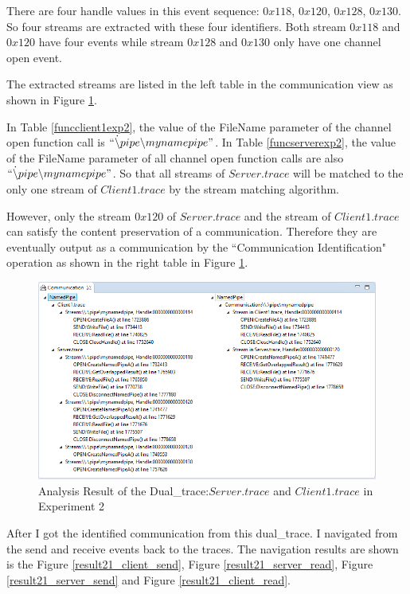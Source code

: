 There are four handle values in this event sequence: $0x118$, $0x120$, $0x128$, $0x130$. So four streams are extracted with these four identifiers. Both stream $0x118$ and $0x120$ have four events while stream $0x128$ and $0x130$ only have one channel open event. 

The extracted streams are listed in the left table in the communication view as shown in Figure \ref{result21}.

In Table \ref{funcclient1exp2}, the value of the FileName parameter of the channel open function call is $``\dot \backslash pipe \backslash mynamepipe"$. In Table \ref{funcserverexp2}, the value of the FileName parameter of all channel open function calls are also $``\dot \backslash pipe \backslash mynamepipe"$. So that all streams of $Server.trace$ will be matched to the only one stream of $Client1.trace$ by the stream matching algorithm.

However, only the stream $0x120$ of $Server.trace$ and the stream of $Client1.trace$ can satisfy the content preservation of a communication. Therefore they are eventually output as a communication by the ``Communication Identification" operation as shown in the right table in Figure \ref{result21}. 

\begin{figure}[H]
\centerline{\includegraphics[scale=0.55]{Figures/result21}}
 \caption{Analysis Result of the Dual\_trace:$Server.trace$ and $Client1.trace$ in Experiment 2}
\label{result21}
\end{figure}

After I got the identified communication from this dual\_trace. I navigated from the send and receive events back to the traces. The navigation results are shown is the Figure \ref{result21_client_send},
Figure \ref{result21_server_read}, 
Figure \ref{result21_server_send} and Figure \ref{result21_client_read}.


